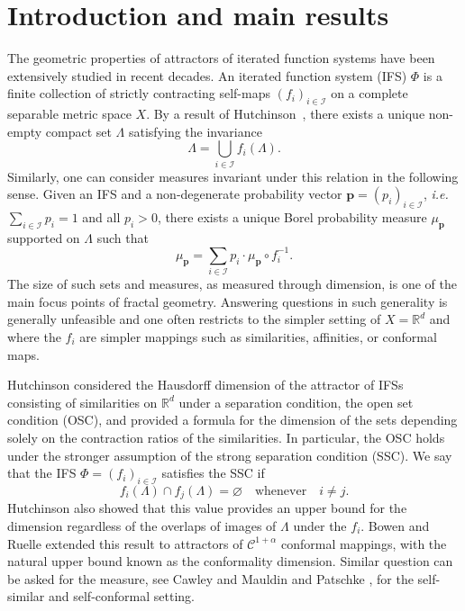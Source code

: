 \documentclass[12pt,]{article}
\theoremstyle{definition}
\theoremstyle{remark}
\newcommand{\0}{\mathbf{0}}
\newcommand{\ie}{{\it i.e.}\/ }
\begin{document}
%
%

\section{Introduction and main results} \label{sec:intro}
The geometric properties of attractors of iterated function systems have been extensively studied in recent
decades.
An iterated function system (IFS) $\Phi$ is a finite collection of strictly contracting self-maps
$(f_i)_{i\in\mathcal{I}}$ on a complete separable metric space $X$. By a result of Hutchinson~\cite{Hutchinson_Attractor_81}, there exists a unique non-empty compact set $\Lambda$ satisfying the
invariance
\begin{equation}\label{eq:Hutchinson}
  \Lambda = \bigcup_{i\in\mathcal{I}} f_i(\Lambda).
\end{equation}
Similarly, one can consider measures invariant under this relation in the following sense.
Given an IFS and a non-degenerate probability vector $\mathbf{p}=(p_i)_{i\in\mathcal{I}}$, \ie
$\sum_{i\in\mathcal{I}}p_i=1$ and all $p_i>0$, there exists a unique Borel probability measure
$\mu_{\mathbf{p}}$ supported on $\Lambda$ such that
\begin{equation}\label{eq:conformaMeasure}
\mu_{\mathbf{p}}=\sum_{i \in \mathcal{I}} p_i \cdot \mu_{\mathbf{p}} \circ f_i^{-1}.
\end{equation}
The size of such sets and measures, as measured through dimension, is one of the main focus points of fractal
geometry. Answering questions in such generality is generally unfeasible and one often restricts to
the simpler setting of $X=\mathbb{R}^d$ and where the $f_i$ are simpler mappings such as
similarities, affinities, or conformal maps.

Hutchinson \cite{Hutchinson_Attractor_81} considered the Hausdorff dimension of the attractor of
IFSs consisting of similarities on $\mathbb{R}^d$ under a separation condition, the open set
condition (OSC), and provided a formula for the dimension of the sets depending solely on the
contraction ratios of the similarities. In particular, the OSC holds under the stronger assumption
of the strong separation condition (SSC). We say that the IFS $\Phi=(f_i)_{i\in \mathcal{I}}$
satisfies the SSC if
\begin{equation*}%
  f_i(\Lambda)\cap f_j(\Lambda) = \varnothing\quad\text{whenever}\quad i\neq j.
\end{equation*}
Hutchinson also showed that this value provides an upper bound for
the dimension regardless of the overlaps of images of $\Lambda$ under the $f_i$.  Bowen
\cite{Bowen75} and Ruelle \cite{Ruelle2004} extended this result to attractors of
$\mathcal{C}^{1+\alpha}$ conformal mappings, with the natural upper bound known as the conformality
dimension. Similar question can be asked for the measure, see Cawley and Mauldin
\cite{CawleyMauldin92} and Patschke \cite{Patzschke97}, for the self-similar and self-conformal
setting. 
\end{document}
